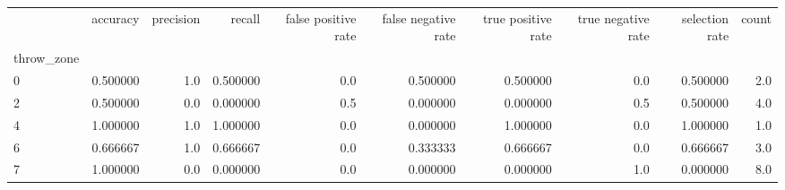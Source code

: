 \begin{tabular}{lrrrrrrrrr}
\toprule
{} &  accuracy &  precision &    recall &  false positive rate &  false negative rate &  true positive rate &  true negative rate &  selection rate &  count \\
throw\_zone &           &            &           &                      &                      &                     &                     &                 &        \\
\midrule
0          &  0.500000 &        1.0 &  0.500000 &                  0.0 &             0.500000 &            0.500000 &                 0.0 &        0.500000 &    2.0 \\
2          &  0.500000 &        0.0 &  0.000000 &                  0.5 &             0.000000 &            0.000000 &                 0.5 &        0.500000 &    4.0 \\
4          &  1.000000 &        1.0 &  1.000000 &                  0.0 &             0.000000 &            1.000000 &                 0.0 &        1.000000 &    1.0 \\
6          &  0.666667 &        1.0 &  0.666667 &                  0.0 &             0.333333 &            0.666667 &                 0.0 &        0.666667 &    3.0 \\
7          &  1.000000 &        0.0 &  0.000000 &                  0.0 &             0.000000 &            0.000000 &                 1.0 &        0.000000 &    8.0 \\
\bottomrule
\end{tabular}

